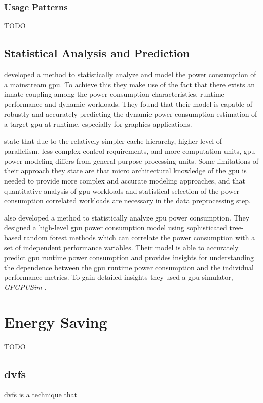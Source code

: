 			\subsubsection{Usage Patterns}
				TODO

		\subsection{Statistical Analysis and Prediction}
			\textcite{Ma2009} developed a method to statistically analyze and model the power consumption of a mainstream \gls{gpu}.
			To achieve this they make use of the fact that there exists an innate coupling among the power consumption characteristics, runtime performance and dynamic workloads.
			They found that their model is capable of robustly and accurately predicting the dynamic power consumption estimation of a target \gls{gpu} at runtime, especially for graphics applications.
			
			\textcite{Ma2009} state that due to the relatively simpler cache hierarchy, higher level of parallelism, less complex control requirements, and more computation units, \gls{gpu} power modeling differs from general-purpose processing units.
			Some limitations of their approach they state are that micro architectural knowledge of the \gls{gpu} is needed to provide more complex and accurate modeling approaches, and that quantitative analysis of \gls{gpu} workloads and statistical selection of the power consumption correlated workloads are necessary in the data preprocessing step.

			\textcite{Chen2011} also developed a method to statistically analyze \gls{gpu} power consumption.
			They designed a high-level \gls{gpu} power consumption model using sophisticated tree-based random forest methods which can correlate the power consumption with a set of independent performance variables.
			Their model is able to accurately predict \gls{gpu} runtime power consumption and provides insights for understanding the dependence between the \gls{gpu} runtime power consumption and the individual performance metrics.
			To gain detailed insights they used a \gls{gpu} simulator, \emph{GPGPUSim} \parencite{Bakhoda2009}.

	\section{Energy Saving}
		TODO

		\subsection{\acrlong{dvfs}}
			\gls{dvfs} is a technique that